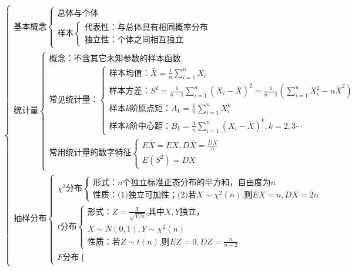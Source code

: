 ﻿\documentclass[lang=cn,11pt]{elegantbook}
\begin{document}
{\small
\[
\begin{cases}
\text{基本概念}
\begin{cases}
\text{总体与个体} \\
\text{样本}
\begin{cases}
\text{代表性：与总体具有相同概率分布} \\
\text{独立性：个体之间相互独立}
\end{cases}
\end{cases} \\[6pt]
\text{统计量}
\begin{cases}
\text{概念：不含其它未知参数的样本函数} \\[6pt]
\text{常见统计量：}
\begin{cases}
\text{样本均值：}\bar{X}=\displaystyle\frac{1}{n}\sum_{i=1}^n X_i \\[6pt]
\text{样本方差：}S^2=\displaystyle\frac{1}{n-1}\sum_{i=1}^n (X_i-\bar{X})^2=\frac{1}{n-1}\left(\sum_{i=1}^n X_i^2-n\bar{X}^2\right) \\[6pt]
\text{样本}k\text{阶原点矩：}A_k=\displaystyle\frac{1}{n}\sum_{i=1}^n X_i^k \\[6pt]
\text{样本}k\text{阶中心距：}B_k=\displaystyle\frac{1}{n}\sum_{i=1}^n (X_i-\bar{X})^k,k=2,3\cdots
\end{cases} \\[6pt]
\text{常用统计量的数字特征}
\begin{cases}
E\bar{X}=EX,D\bar{X}=\displaystyle\frac{DX}{n} \\[6pt]
E(S^2)=DX
\end{cases}
\end{cases} \\[6pt]
\text{抽样分布}
\begin{cases}
\chi^2\text{分布}
\begin{cases}
\text{形式：}n\text{个独立标准正态分布的平方和，自由度为}n \\[6pt]
\text{性质：(1)独立可加性；(2)若}X\sim\chi^2(n)\text{,则}EX=n,DX=2n
\end{cases} \\[6pt]
t\text{分布}
\begin{cases}
\text{形式：}Z=\displaystyle\frac{X}{\sqrt{Y/n}}\text{,其中}X,Y\text{独立，} \\[6pt]
X\sim N(0,1),Y\sim\chi^2(n) \\[6pt]
\text{性质：若}Z\sim t(n)\text{,则}EZ=0,DZ=\displaystyle\frac{n}{n-2}
\end{cases} \\[6pt]
F\text{分布}
\begin{cases}

\end{cases}
\end{cases}
\end{cases}\]}
\end{document}
